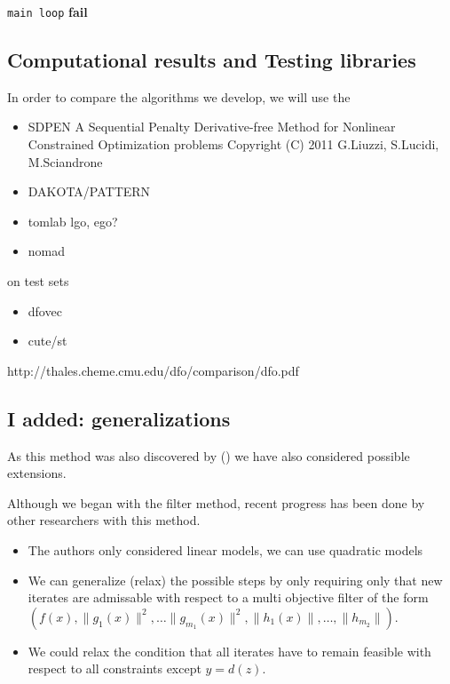 \documentclass{article}
\begin{document}
\begin{algorithm}
\begin{algorithmic}[1]
			\EndIf
		\Else
			\State \Goto \texttt{main loop}
		\EndIf
	\Else
			\textbf{fail}
		\EndIf
	\EndIf
\EndWhile
\EndProcedure
\end{algorithmic}
\end{algorithm}

\FloatBarrier

\subsection{Computational results and Testing libraries}
In order to compare the algorithms we develop, we will use the



\begin{itemize}
\item SDPEN
A Sequential Penalty Derivative-free Method for Nonlinear
Constrained Optimization problems
Copyright (C) 2011  G.Liuzzi, S.Lucidi, M.Sciandrone
\item DAKOTA/PATTERN
\item tomlab lgo, ego?
\item nomad
\end{itemize}

on test sets

\begin{itemize}
\item dfovec
\item cute/st
\end{itemize}

http://thales.cheme.cmu.edu/dfo/comparison/dfo.pdf


\subsection{I added: generalizations}

As this method was also discovered by () we have also considered possible extensions.

Although we began with the filter method, recent progress has been done by other researchers with this method.



\begin{itemize}
\item The authors only considered linear models, we can use quadratic models
\item We can generalize (relax) the possible steps by only requiring only that new iterates are admissable with respect to a multi objective filter of the form $(f(x), \|g_1(x)\|^2, \ldots \|g_{m_1}(x)\|^2, \|h_1(x)\|, \ldots, \|h_{m_2}\|)$.
\item We could relax the condition that all iterates have to remain feasible with respect to all constraints except $y = d(z)$.
\end{itemize}
\end{document}
